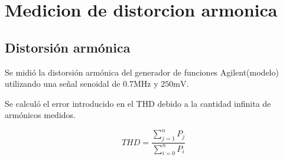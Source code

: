 \chapter{Medicion de distorcion armonica}
\section{Distorsión armónica}
Se midió la distorsión armónica del generador de funciones Agilent(modelo)
utilizando una señal senoidal de $0.7\si{\mega\hertz}$ y $250\si{\milli\volt}$.

Se calculó el error introducido en el THD debido a la cantidad infinita de armónicos
medidos.

\begin{equation}
    THD=\frac{\sum_{j=1}^{n} P_j}{\sum_{i=0}^{n} P_i}
\end{equation}

